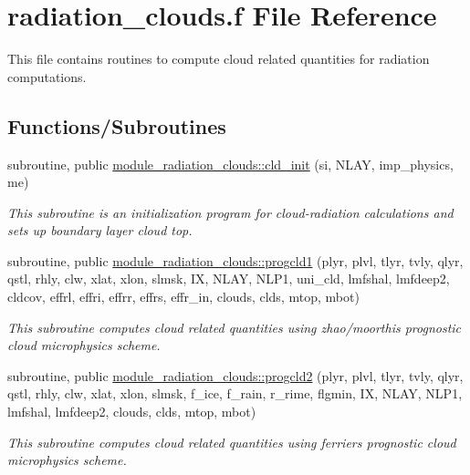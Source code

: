 \hypertarget{radiation__clouds_8f}{}\section{radiation\+\_\+clouds.\+f File Reference}
\label{radiation__clouds_8f}


This file contains routines to compute cloud related quantities for radiation computations.  


\subsection*{Functions/\+Subroutines}
\textbf{ }\par
\begin{DoxyCompactItemize}
\item 
subroutine, public \hyperlink{group__module__radiation__clouds_ga0e1ee94c9ca85849a219803325a61184}{module\+\_\+radiation\+\_\+clouds\+::cld\+\_\+init} (si, N\+L\+AY, imp\+\_\+physics, me)
\begin{DoxyCompactList}\small\item\em This subroutine is an initialization program for cloud-\/radiation calculations and sets up boundary layer cloud top. \end{DoxyCompactList}\end{DoxyCompactItemize}

\textbf{ }\par
\begin{DoxyCompactItemize}
\item 
subroutine, public \hyperlink{group__module__radiation__clouds_gafa23f5bc69fa713abfa32939fd96ade8}{module\+\_\+radiation\+\_\+clouds\+::progcld1} (plyr, plvl, tlyr, tvly, qlyr, qstl, rhly, clw, xlat, xlon, slmsk, IX, N\+L\+AY, N\+L\+P1, uni\+\_\+cld, lmfshal, lmfdeep2, cldcov, effrl, effri, effrr, effrs, effr\+\_\+in, clouds, clds, mtop, mbot)
\begin{DoxyCompactList}\small\item\em This subroutine computes cloud related quantities using zhao/moorthi\textquotesingle{}s prognostic cloud microphysics scheme. \end{DoxyCompactList}\end{DoxyCompactItemize}

\textbf{ }\par
\begin{DoxyCompactItemize}
\item 
subroutine, public \hyperlink{group__module__radiation__clouds_ga3fd7643ce526761b17d04eec6a332333}{module\+\_\+radiation\+\_\+clouds\+::progcld2} (plyr, plvl, tlyr, tvly, qlyr, qstl, rhly, clw, xlat, xlon, slmsk, f\+\_\+ice, f\+\_\+rain, r\+\_\+rime, flgmin, IX, N\+L\+AY, N\+L\+P1, lmfshal, lmfdeep2, clouds, clds, mtop, mbot)
\begin{DoxyCompactList}\small\item\em This subroutine computes cloud related quantities using ferrier\textquotesingle{}s prognostic cloud microphysics scheme. \end{DoxyCompactList}\end{DoxyCompactItemize}

